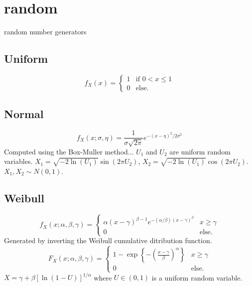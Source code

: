 % 
%

\section{random}
\label{module:random}
random number generators

\subsection{Uniform}
\[
    f_X(x) =
    \begin{cases}
        1 & \text{if $0 < x \le 1$} \\
        0 & \text{else}.
    \end{cases}
\]

\subsection{Normal}
\[
    f_X(x;\sigma,\eta) =
        \frac{1}{\sigma \sqrt{2 \pi}}
        e^{-\left(x-\eta\right)^2/{2\sigma^2}}
\]
Computed using the Box-Muller method...
$U_1$ and $U_2$ are uniform random variables.
$X_1 = \sqrt{-2\ln(U_1)} \sin\left(2 \pi U_2\right)$,
$X_2 = \sqrt{-2\ln(U_1)} \cos\left(2 \pi U_2\right)$.
$X_1, X_2 \sim N(0,1)$.

\subsection{Weibull}
\[
    f_X(x;\alpha,\beta,\gamma) =
    \begin{cases}
        \alpha(x-\gamma)^{\beta-1}
        e^{-(\alpha/\beta)(x-\gamma)^\beta} & \text{$x \ge \gamma$} \\
        0 &                                   \text{else}.
    \end{cases}
\]
Generated by inverting the Weibull cumulative ditribution function.
\[
    F_X(x;\alpha,\beta,\gamma) =
    \begin{cases}
        1 - \exp\left\{
            -\left(\frac{x-\gamma}{\beta}\right)^\alpha
        \right\} &                            \text{$x \ge \gamma$} \\
        0 &                                   \text{else}.
    \end{cases}
\]
$X = \gamma + \beta\left[ \ln\left(1 - U\right) \right]^{1/\alpha}$
where $U \in (0,1)$ is a uniform random variable.


